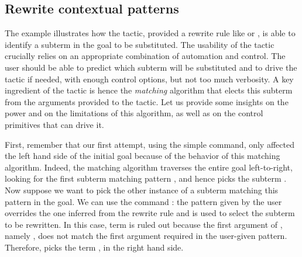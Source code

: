 %
%



\subsection{Rewrite contextual patterns \mcbLEVELx{}}\label{sec:rewrite2}

The example  illustrates how the  tactic, provided a
rewrite rule like  or , is able
to identify a
subterm in the goal to be substituted. The usability of the
tactic crucially relies on an appropriate combination of automation
and control. The user should be able to predict which subterm will be
substituted and to drive the tactic if needed, with enough control
options, but not too much verbosity. A key ingredient of the
 tactic is hence the \emph{matching} algorithm that
elects this subterm from the arguments provided to the tactic. Let us
provide some insights on the power and on the limitations of this
algorithm, as well as on the control primitives that can drive it.

First, remember that our first attempt, using the simple
 command, only
affected the left hand side of the initial goal because of the
behavior of this matching algorithm.
Indeed, the matching algorithm traverses the entire goal
left-to-right, looking for the first subterm matching pattern
\C{(_ <= _)},  and hence picks the subterm .
Now suppose we want to pick
the other instance of a subterm matching this pattern in the goal. We
can use the command : the
pattern given by the user overrides the one inferred from the rewrite
rule and is used to select the subterm to be rewritten. In this case,
term  is ruled out because the first argument of
\C{<=}, namely , does not match the first argument 
required in the user-given pattern. Therefore,  picks the term
, in the right hand side.

